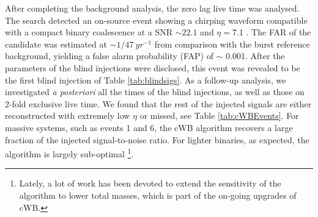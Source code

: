 After completing the background analysis, the zero lag live 
time was analysed. The search detected an on-source event showing a chirping 
waveform compatible with a compact binary coalescence at a SNR 
$\sim 22.1$ and $\eta = 7.1$ . The FAR of the candidate was 
estimated at $\sim 1/47~yr^{-1}$ from
comparison with the burst reference background, yielding a false alarm 
probability (FAP) of $\sim$ 0.001. After the parameters of the blind injections
were disclosed, this event was revealed to be the first blind injection of 
Table 
\ref{tab:blindsigs}.
As a follow-up analysis, we investigated \textit{a posteriori} all the times of 
the blind injections, as well as those on 2-fold exclusive live time. We found 
that the rest of the injected signals are either reconstructed with extremely 
low $\eta$ or missed, see Table \ref{tab:cWBEvents}. For massive systems, such 
as events 1 and 6, the cWB algorithm recovers a large fraction of the 
injected signal-to-noise ratio. For lighter binaries, as expected, the 
algorithm is largely sub-optimal
\footnote{Lately, a lot of work has been 
devoted to extend the sensitivity of the algorithm to lower total masses, which 
is part of the on-going upgrades of cWB.}.     

